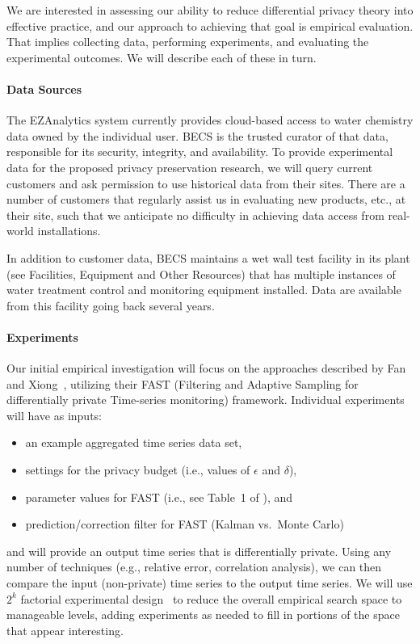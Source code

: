 We are interested in assessing our ability to reduce differential
privacy theory into effective practice, and our approach to achieving
that goal is empirical evaluation.  That implies collecting data,
performing experiments, and evaluating the experimental outcomes.
We will describe each of these in turn.

\paragraph{Data Sources}
The EZAnalytics\texttrademark{} system currently provides cloud-based access to
water chemistry data owned by the individual user.
BECS is the trusted curator of that data, responsible for its security,
integrity, and availability.  To provide experimental
data for the proposed privacy preservation research, we will query 
current customers and ask permission to use historical data from their
sites.  There are a number of customers that regularly assist
us in evaluating new products, etc., at their site, such that we anticipate
no difficulty in achieving data access from real-world installations.

In addition to customer data, BECS maintains a wet wall test facility in
its plant (see Facilities, Equipment and Other Resources) that has multiple
instances of water treatment control and monitoring equipment installed.
Data are available from this facility going back several years.

\paragraph{Experiments}
Our initial empirical investigation will focus on the approaches
described by Fan and Xiong~\cite{fx12,fx14}, utilizing their
FAST (Filtering and Adaptive Sampling for differentially private
Time-series monitoring) framework. Individual experiments will have
as inputs:
\begin{itemize}
\item an example aggregated time series data set,
\item settings for the privacy budget
(i.e., values of $\epsilon$ and $\delta$),
\item parameter values for FAST (i.e., see Table~1 of \cite{fx14}), and
\item prediction/correction filter for FAST (Kalman vs.~Monte Carlo)
\end{itemize}
and will provide an output time series that is differentially private.
Using any number of techniques (e.g., relative error, correlation analysis), 
we can then compare the input (non-private) time series to the output
time series.
We will use $2^k$ factorial experimental design~\cite{Jain91}
to reduce the overall empirical search space to manageable levels,
adding experiments as needed to fill in portions of the space that
appear interesting.

